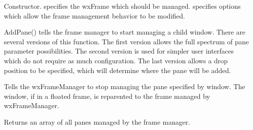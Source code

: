 

\label{wxframemanagerwxframemanager}


Constructor.  specifies the wxFrame which should be managed.
  specifies options which allow the frame management behavior
to be modified.

\label{wxframemanagerdtor}


\label{wxframemanageraddpane}





AddPane() tells the frame manager to start managing a child window. There are several versions of this function. The first version allows the full spectrum of pane parameter possibilities. The second version is used for simpler user interfaces which do not require as much configuration.  The last version allows a drop position to be specified, which will determine where the pane will be added.

\label{wxframemanagerdetachpane}


Tells the wxFrameManager to stop managing the pane specified by window.
The window, if in a floated frame, is reparented to the frame managed
by wxFrameManager.

\label{wxframemanagergetallpanes}


Returns an array of all panes managed by the frame manager.

\label{wxframemanagergetartprovider}

